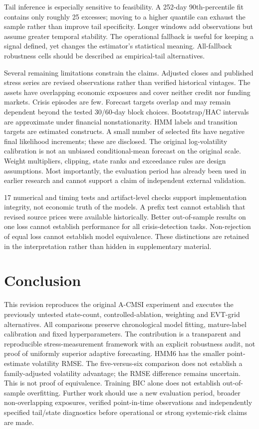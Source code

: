 \documentclass[11pt]{article}
\begin{document}
Tail inference is especially sensitive to feasibility. A 252-day 90th-percentile fit contains only
roughly 25 excesses; moving to a higher quantile can exhaust the sample rather than improve tail
specificity. Longer windows add observations but assume greater temporal stability. The operational
fallback is useful for keeping a signal defined, yet changes the estimator's statistical meaning.
All-fallback robustness cells should be described as empirical-tail alternatives.

Several remaining limitations constrain the claims. Adjusted closes and published stress series
are revised observations rather than verified historical vintages. The assets have overlapping
economic exposures and cover neither credit nor funding markets. Crisis episodes are few. Forecast
targets overlap and may remain dependent beyond the tested 30/60-day block choices. Bootstrap/HAC
intervals are approximate under financial nonstationarity. HMM labels and transition targets are
estimated constructs. A small number of selected fits have negative final likelihood increments;
these are disclosed. The original log-volatility calibration is not an unbiased conditional-mean
forecast on the original scale. Weight multipliers, clipping, state ranks and exceedance rules
are design assumptions. Most importantly, the evaluation period has already been used in earlier
research and cannot support a claim of independent external validation.

17 numerical and timing tests and artifact-level checks support implementation integrity,
not economic truth of the models. A prefix test cannot establish that revised source prices were
available historically. Better out-of-sample results on one loss cannot establish performance for
all crisis-detection tasks. Non-rejection of equal loss cannot establish model equivalence. These
distinctions are retained in the interpretation rather than hidden in supplementary material.

\section{Conclusion}
This revision reproduces the original A-CMSI experiment and executes the previously untested
state-count, controlled-ablation, weighting and EVT-grid alternatives. All comparisons preserve
chronological model fitting, mature-label calibration and fixed hyperparameters. The contribution
is a transparent and reproducible stress-measurement framework with an explicit robustness audit,
not proof of uniformly superior adaptive forecasting.
HMM6 has the smaller point-estimate volatility RMSE. The five-versus-six comparison does not establish a family-adjusted volatility advantage; the RMSE difference remains uncertain. This is not proof of equivalence. Training BIC alone does not establish out-of-sample overfitting.
Further work should use a new evaluation period, broader non-overlapping exposures, verified
point-in-time observations and independently specified tail/state diagnostics before operational
or strong systemic-risk claims are made.
\end{document}

